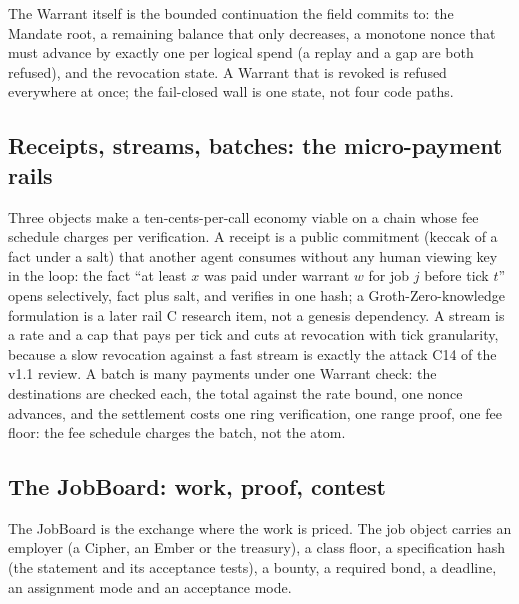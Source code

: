 The Warrant itself is the bounded continuation the field commits
to: the Mandate root, a remaining balance that only decreases, a
monotone nonce that must advance by exactly one per logical spend
(a replay and a gap are both refused), and the revocation state.
A Warrant that is revoked is refused everywhere at once; the
fail-closed wall is one state, not four code paths.

\subsection{Receipts, streams, batches: the micro-payment rails}

Three objects make a ten-cents-per-call economy viable on a chain
whose fee schedule charges per verification. A receipt is a
public commitment ($\mathrm{keccak}$ of a fact under a salt) that
another agent consumes without any human viewing key in the loop:
the fact ``at least $x$ was paid under warrant $w$ for job $j$
before tick $t$'' opens selectively, fact plus salt, and verifies
in one hash; a Groth-Zero-knowledge formulation is a later rail C
research item, not a genesis dependency. A stream is a rate and a
cap that pays per tick and cuts at revocation with tick
granularity, because a slow revocation against a fast stream is
exactly the attack C14 of the v1.1 review. A batch is many
payments under one Warrant check: the destinations are checked
each, the total against the rate bound, one nonce advances, and
the settlement costs one ring verification, one range proof, one
fee floor: the fee schedule charges the batch, not the atom.

\subsection{The JobBoard: work, proof, contest}

The JobBoard is the exchange where the work is priced. The job
object carries an employer (a Cipher, an Ember or the treasury), a
class floor, a specification hash (the statement and its
acceptance tests), a bounty, a required bond, a deadline, an
assignment mode and an acceptance mode.


